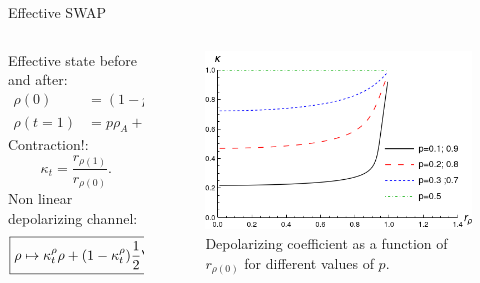 \begin{frame}{Effective SWAP}
    \begin{columns}
        \begin{column}{0.5\textwidth}
            Effective state before and after:
            \begin{align*}
                \rho(0)&=(1-p)\rho_{A}+p\rho_{B},\\
                \rho(t=1)&=p\rho_{A}+(1-p)\rho_{B}.
                \end{align*}
                Contraction!:
                \begin{equation*}
                    \kappa_{t}=\frac{r_{\rho(1)}}{r_{\rho(0)}}.
                  \end{equation*}
                  Non linear depolarizing channel:
                  \begin{equation*}
                      \boxed{\rho\mapsto\kappa_{t}^{\rho}\rho+(1-\kappa_{t}^{\rho})\frac{1}{2}\Id}
                    \end{equation*}
        \end{column}
        \begin{column}{0.5\textwidth}
            \begin{figure}[h!]
                \centering
                \includegraphics[width=0.9\linewidth]{figures/ContractionFactorSWAP_2D_r0to1_legend.png}
                \caption{Depolarizing coefficient as a function of $r_{\rho(0)}$ for different values of $p$.}
                \label{fig:SWAPFactor2D}
              \end{figure}
        \end{column}
    \end{columns}
\end{frame}


